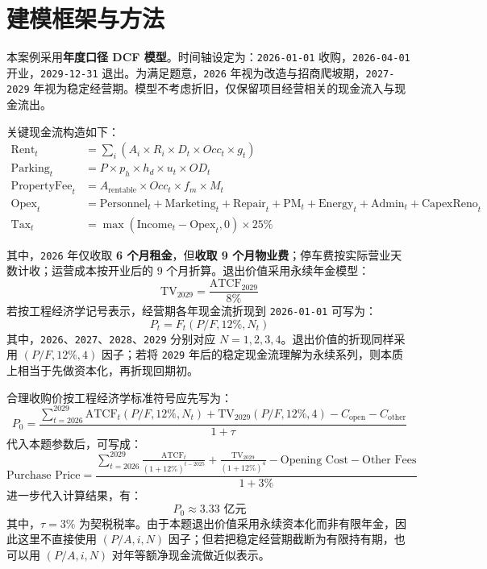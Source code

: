 \documentclass[11pt,a4paper]{ctexart}
\begin{document}
\section{建模框架与方法}

本案例采用\textbf{年度口径 DCF 模型}。时间轴设定为：\texttt{2026-01-01} 收购，\texttt{2026-04-01} 开业，\texttt{2029-12-31} 退出。为满足题意，\texttt{2026} 年视为改造与招商爬坡期，\texttt{2027-2029} 年视为稳定经营期。模型不考虑折旧，仅保留项目经营相关的现金流入与现金流出。

关键现金流构造如下：
\begin{align*}
\text{Rent}_t &= \sum_i \left(A_i \times R_i \times D_t \times Occ_t \times g_t \right) \\
\text{Parking}_t &= P \times p_h \times h_d \times u_t \times OD_t \\
\text{PropertyFee}_t &= A_{\text{rentable}} \times Occ_t \times f_m \times M_t \\
\text{Opex}_t &= \text{Personnel}_t+\text{Marketing}_t+\text{Repair}_t+\text{PM}_t+\text{Energy}_t+\text{Admin}_t+\text{CapexReno}_t \\
\text{Tax}_t &= \max(\text{Income}_t-\text{Opex}_t,0)\times 25\%
\end{align*}

其中，\texttt{2026} 年仅收取 \textbf{6 个月租金}，但\textbf{收取 9 个月物业费}；停车费按实际营业天数计收；运营成本按开业后的 9 个月折算。退出价值采用永续年金模型：
\[
\text{TV}_{2029}=\frac{\text{ATCF}_{2029}}{8\%}
\]
若按工程经济学记号表示，经营期各年现金流折现到 \texttt{2026-01-01} 可写为：
\[
P_t = F_t(P/F,12\%,N_t)
\]
其中，\texttt{2026}、\texttt{2027}、\texttt{2028}、\texttt{2029} 分别对应 \(N=1,2,3,4\)。退出价值的折现同样采用 \((P/F,12\%,4)\) 因子；若将 \texttt{2029} 年后的稳定现金流理解为永续系列，则本质上相当于先做资本化，再折现回期初。

合理收购价按工程经济学标准符号应先写为：
\[
P_0=\frac{\sum_{t=2026}^{2029} \text{ATCF}_t(P/F,12\%,N_t)+\text{TV}_{2029}(P/F,12\%,4)-C_{\text{open}}-C_{\text{other}}}{1+\tau}
\]
代入本题参数后，可写成：
\[
\text{Purchase Price}=\frac{\sum_{t=2026}^{2029}\frac{\text{ATCF}_{t}}{(1+12\%)^{t-2025}}+\frac{\text{TV}_{2029}}{(1+12\%)^4}-\text{Opening Cost}-\text{Other Fees}}{1+3\%}
\]
进一步代入计算结果，有：
\[
P_0 \approx 3.33 \text{ 亿元}
\]
其中，\(\tau=3\%\) 为契税税率。由于本题退出价值采用永续资本化而非有限年金，因此这里不直接使用 \((P/A,i,N)\) 因子；但若把稳定经营期截断为有限持有期，也可以用 \((P/A,i,N)\) 对年等额净现金流做近似表示。
\end{document}
